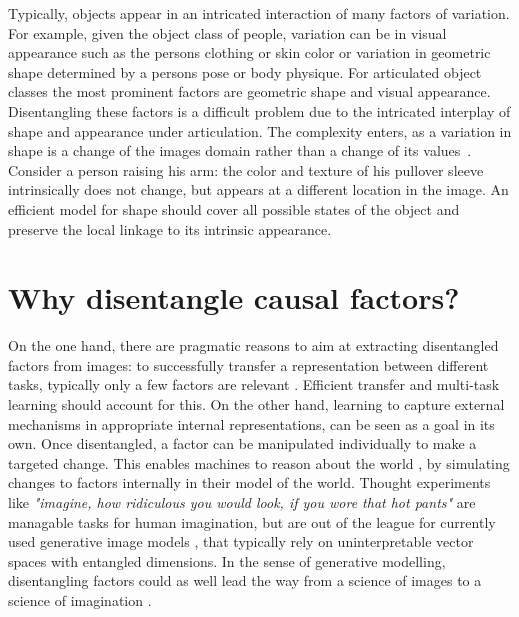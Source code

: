 	Typically, objects appear in an intricated interaction of many factors of variation. 
	For example, given the object class of people, variation can be in visual appearance such as the persons clothing or skin color or variation in geometric shape determined by a persons pose or body physique.
	For articulated object classes the most prominent factors are geometric shape and visual appearance.
	Disentangling these factors is a difficult problem due to the intricated interplay of shape and appearance under articulation.
	The complexity enters, as a variation in shape is a change of the images domain rather than a change of its values~\cite{Shu:2018ua}.
	Consider a person raising his arm: the color and texture of his pullover sleeve intrinsically does not change, but appears at a different location in the image. An efficient model for shape should cover all possible states of the object and preserve the local linkage to its intrinsic appearance.

	\section{Why disentangle causal factors?}
	On the one hand, there are pragmatic reasons to aim at extracting disentangled factors from images: to successfully transfer a representation between different tasks, typically only a few factors are relevant \cite{Bengio:2013bu}.
	Efficient transfer and multi-task learning should account for this.
	On the other hand, learning to capture external mechanisms in appropriate internal representations, can be seen as a goal in its own.
	Once disentangled, a factor can be manipulated individually to make a targeted change.
	This enables machines to reason about the world \cite{Pearl:2018im}, by simulating changes to factors internally in their model of the world.
	Thought experiments like \textit{"imagine, how ridiculous you would look, if you wore that hot pants"} are managable tasks for human imagination, but are out of the league for currently used generative image models \cite{Goodfellow:2014td, Kingma:2013tz}, that typically rely on uninterpretable vector spaces with entangled dimensions.
	In the sense of generative modelling, disentangling factors could as well lead the way from a science of images to a science of imagination \cite{Mahadevan:2018tz}.

